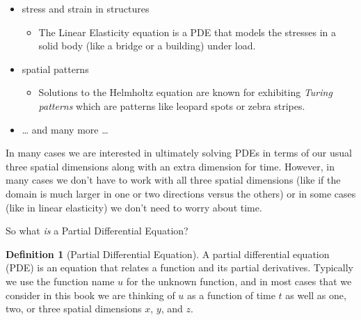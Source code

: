 \documentclass[
]{book}
\providecommand{\tightlist}{%
  \setlength{\itemsep}{0pt}\setlength{\parskip}{0pt}}
\theoremstyle{definition}
\newtheorem{definition}{Definition}[chapter]
\theoremstyle{definition}
\theoremstyle{definition}
\theoremstyle{remark}
\begin{document}
\begin{itemize}
  \begin{itemize}
  \tightlist
  \item
    The Navier-Stokes equations are a system of PDEs that model fluids in three dimensions -- including turbulent flow.
  \item
    Darcy's Law and Richard's equation are PDE models for the motion of fluids moving through saturated and unsaturated soils.
  \end{itemize}
\item
  stress and strain in structures

  \begin{itemize}
  \tightlist
  \item
    The Linear Elasticity equation is a PDE that models the stresses in a solid body (like a bridge or a building) under load.
  \end{itemize}
\item
  spatial patterns

  \begin{itemize}
  \tightlist
  \item
    Solutions to the Helmholtz equation are known for exhibiting \emph{Turing patterns} which are patterns like leopard spots or zebra stripes.\\
  \end{itemize}
\item
  \ldots{} and many more \ldots{}
\end{itemize}

In many cases we are interested in ultimately solving PDEs in terms of our usual three spatial dimensions along with an extra dimension for time. However, in many cases we don't have to work with all three spatial dimensions (like if the domain is much larger in one or two directions versus the others) or in some cases (like in linear elasticity) we don't need to worry about time.

So what \emph{is} a Partial Differential Equation?

\begin{definition}[Partial Differential Equation]
\protect\hypertarget{def:unnamed-chunk-508}{}{\label{def:unnamed-chunk-508} {} }A partial differential equation (PDE) is an equation that relates a function and its partial derivatives. Typically we use the function name \(u\) for the unknown function, and in most cases that we consider in this book we are thinking of \(u\) as a function of time \(t\) as well as one, two, or three spatial dimensions \(x\), \(y\), and \(z\).
\end{definition}
\end{document}
